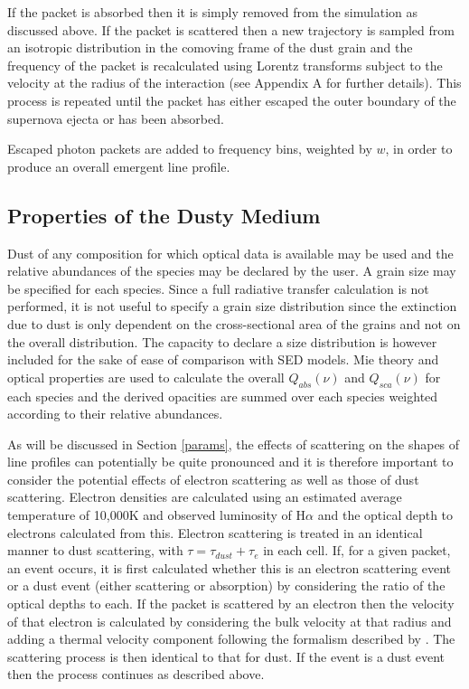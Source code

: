 \documentclass[useAMS,usenatbib,usegraphicx]{mnras}
\begin{document}
If the packet is absorbed then it is simply removed from the simulation as 
discussed above.  If the packet is scattered then a new trajectory is 
sampled from an isotropic distribution in the comoving frame of the dust 
grain and the frequency of the packet is recalculated using Lorentz 
transforms subject to the velocity at the radius of the interaction (see 
Appendix A for further details).  This process is repeated until the 
packet has either escaped the outer boundary of the supernova ejecta or has been 
absorbed.
   
Escaped photon packets are added to frequency bins, weighted by $w$, in order to 
produce an overall emergent line profile.


\subsection{Properties of the Dusty Medium}

Dust of any composition for which optical data is available may be used
and the relative abundances of the species may be declared by the user.  
A grain size may be specified for each species.  Since a full radiative 
transfer calculation is not performed, it is not useful to specify a grain 
size distribution since the extinction due to dust is only dependent on the 
cross-sectional area of the grains and not on the overall distribution.  
The capacity to declare a size distribution is however included for the 
sake of ease of comparison with SED models.  Mie theory and optical properties are used 
to calculate the overall $Q_{abs}(\nu)$ and $Q_{sca}(\nu)$ for each 
species and the derived opacities are summed over each species weighted 
according to their relative abundances.


As will be discussed in Section \ref{params}, the effects of scattering 
on the shapes of line profiles can potentially be quite pronounced and it 
is therefore important to consider the potential effects of electron 
scattering as well as those of dust scattering.  Electron densities are 
calculated using an estimated average temperature of 10,000K and observed luminosity 
of H${\alpha}$ and the optical depth to electrons calculated from this.  
Electron scattering is treated in an identical manner to dust scattering, 
with $\tau = \tau_{dust}+\tau_{e}$ in each cell.  If, for a given 
packet, an event occurs, it is first calculated whether this is an electron scattering event or a dust 
event (either scattering or absorption) by considering the ratio of the optical depths to each.  If the packet is scattered by an electron then the velocity of that electron is calculated by considering the bulk velocity at that radius and adding a thermal velocity component following the formalism described by \citet{Hillier1991}.  The scattering 
process is then identical to that for dust.  If the event is a dust event then the process continues as described above.
\end{document}
